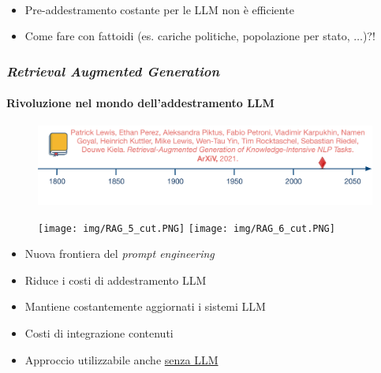 \begin{frame}[t]
{\begin{minipage}[t]{\textwidth}
\begin{figure}
        \end{figure}
    \end{minipage}
    \\\vspace*{.3cm}
    \begin{minipage}[t]{\textwidth}
        \begin{itemize}[leftmargin=10pt,align=right]
            \item[\alert{\faHandORight}] Pre-addestramento costante per le LLM non è efficiente
            \item[\alert{\faHandORight}] Come fare con \alert{fattoidi} (es. cariche politiche, popolazione per stato, $\ldots$)?!
        \end{itemize}
    \end{minipage}
}
\end{frame}
%
\begin{frame}[t] \frametitle{\emph{Retrieval Augmented Generation}}
{\scriptsize
{}
\framesubtitle{Rivoluzione nel mondo dell'addestramento LLM}
\vspace*{-.5cm}
    \begin{minipage}[t]{\textwidth}
        \begin{figure}[ht]
            \centering
            \includegraphics[width=\textwidth]{img/AI-timeline-2021-2.png}
        \end{figure}
    \end{minipage}
    \begin{minipage}[t]{.60\textwidth}
        \begin{figure}[ht]
            \centering
            \texttt{[image: img/RAG\_5\_cut.PNG]}
            \texttt{[image: img/RAG\_6\_cut.PNG]}
        \end{figure}
    \end{minipage}
    \hfill
    \begin{minipage}[t]{.35\textwidth}
        \begin{itemize}[leftmargin=10pt,align=right]
            \item[\alert{\faHandORight}] Nuova frontiera del \emph{prompt engineering}
            \item[\alert{\faHandORight}] Riduce i costi di addestramento LLM
            \item[\alert{\faHandORight}] Mantiene costantemente aggiornati i sistemi LLM
            \item[\alert{\faHandORight}] Costi di integrazione contenuti
            \item[\alert{\faHandORight}] \alert{Approccio utilizzabile anche \underline{senza LLM}}
        \end{itemize}
    \end{minipage}
}
\end{frame}
